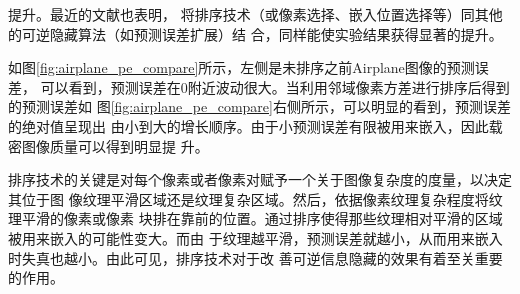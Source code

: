 提升。最近的文献也表明\cite{sachnev2009reversible,hong2012adaptive}，
将排序技术（或像素选择、嵌入位置选择等）同其他的可逆隐藏算法（如预测误差扩展）结
合，同样能使实验结果获得显著的提升。
\par
如图\ref{fig:airplane_pe_compare}所示，左侧是未排序之前Airplane图像的预测误差，
可以看到，预测误差在0附近波动很大。当利用邻域像素方差进行排序后得到的预测误差如
图\ref{fig:airplane_pe_compare}右侧所示，可以明显的看到，预测误差的绝对值呈现出
由小到大的增长顺序。由于小预测误差有限被用来嵌入，因此载密图像质量可以得到明显提
升。
\par
排序技术的关键是对每个像素或者像素对赋予一个关于图像复杂度的度量，以决定其位于图
像纹理平滑区域还是纹理复杂区域。然后，依据像素纹理复杂程度将纹理平滑的像素或像素
块排在靠前的位置。通过排序使得那些纹理相对平滑的区域被用来嵌入的可能性变大。而由
于纹理越平滑，预测误差就越小，从而用来嵌入时失真也越小。由此可见，排序技术对于改
善可逆信息隐藏的效果有着至关重要的作用。



